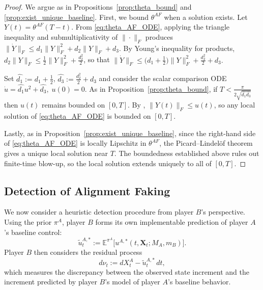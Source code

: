 \documentclass[letterpaper, 10 pt, conference]{ieeeconf}
\newcommand{\E}{\mathbb E}
\newcommand{\rh}[1]{\textcolor{purple}{\textsf{[RH: #1]}}}
\newcommand{\dr}[1]{\textcolor{red}{\textsf{[DR: #1]}}}
\begin{document}
\begin{proof}
    We argue as in Propositions~\ref{prop:theta_bound} and \ref{prop:exist_unique_baseline}. 
    First, we bound $\theta^{AF}$ when a solution exists.  
    Let $Y(t)= \theta^{AF}(T-t)$. 
    From \eqref{eq:theta_AF_ODE}, applying the triangle inequality and submultiplicativity of $\|\cdot\|_F$ produces $\|\dot{Y}\|_F \leq d_1\|Y\|_F^2 + d_2\|Y\|_F + d_3$.
    By Young's inequality for products, $d_2\|Y\|_F \leq \tfrac{1}{2}\|Y\|_F^2 + \tfrac{d_2^2}{2}$,
    so that $\|\dot{Y}\|_F \leq \big(d_1 + \tfrac{1}{2}\big)\|Y\|_F^2 + \tfrac{d_2^2}{2} + d_3. $
    
    Set $\hat{d_1} := d_1 + \tfrac{1}{2}$, $\hat{d_3} := \tfrac{d_2^2}{2} + d_3$ and consider the scalar comparison ODE $
        \dot{u} = \hat{d_1} u^2 + \hat{d_3}, \; u(0) = 0.$   As in Proposition~\ref{prop:theta_bound}, if $T < \tfrac{\pi}{2\sqrt{\hat{d_1}\hat{d_3}}}$ then $u(t)$ remains bounded on $[0,T]$.
    By \cite[Corollary~6.3]{hale2009ordinary}, $\|Y(t)\|_F \leq u(t)$, so any local solution of \eqref{eq:theta_AF_ODE} is bounded on \([0,T]\).
    
    Lastly, as in Proposition~\ref{prop:exist_unique_baseline}, 
since the right-hand side of \eqref{eq:theta_AF_ODE} is locally Lipschitz in \(\theta^{AF}\), the Picard--Lindel\"of theorem gives a unique local solution near \(T\). The boundedness established above rules out finite-time blow-up, so the local solution extends uniquely to all of \([0,T]\).   %
\end{proof}

\subsection{Detection of Alignment Faking}\label{sec:detection}
We now consider a heuristic detection procedure from player \(B\)'s perspective. Using the prior \(\pi^A\), player \(B\) forms its own implementable prediction of player \(A\)'s baseline control:
\begin{equation*}
    \widetilde{u}^{A, \ast}_t := \E^{\pi^A}\big[ u^{A,\ast}(t, \bm{X}_t; M_A, m_B)\big].
\end{equation*}
Player $B$ then considers the residual process
\[d\nu_t := dX_t^A - \widetilde{u}^{A,\ast}_t\,dt, \]
which measures the discrepancy between the observed state increment and the increment predicted by player \(B\)'s model of player \(A\)'s baseline behavior.
\end{document}
